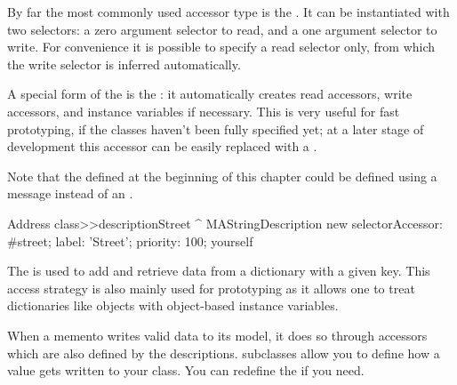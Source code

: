 \documentclass[a4paper,10pt,twoside]{book}
\begin{document}
By far the most commonly used accessor type is the . It can be instantiated with two selectors: a zero argument selector to read, and a one argument selector to write. For convenience 
it is possible to specify a read selector only, from which the write selector is 
inferred automatically. 

A special form of the  is the : it 
automatically creates read accessors, write accessors, and instance variables 
if necessary. This is very useful for fast prototyping, if the  classes 
haven't been fully specified yet; at a later stage of development this accessor 
can be easily replaced with a . 

Note that the  defined at the beginning of this chapter could be defined using a  message instead of an . 

\begin{code}{}
Address class>>descriptionStreet
	^ MAStringDescription new 
			selectorAccessor: #street;
			label: 'Street';
			priority: 100; 
			yourself
\end{code}

The  is used to add and retrieve data from a dictionary 
with a given key. This access strategy is also mainly used for prototyping 
as it allows one to treat dictionaries like objects with object-based instance 
variables. 



When a memento writes valid data to its model, it does so through accessors which are also defined by 
the descriptions.  subclasses allow you to define how a value gets written to your class. You can redefine the  if you need. 
\end{document}
